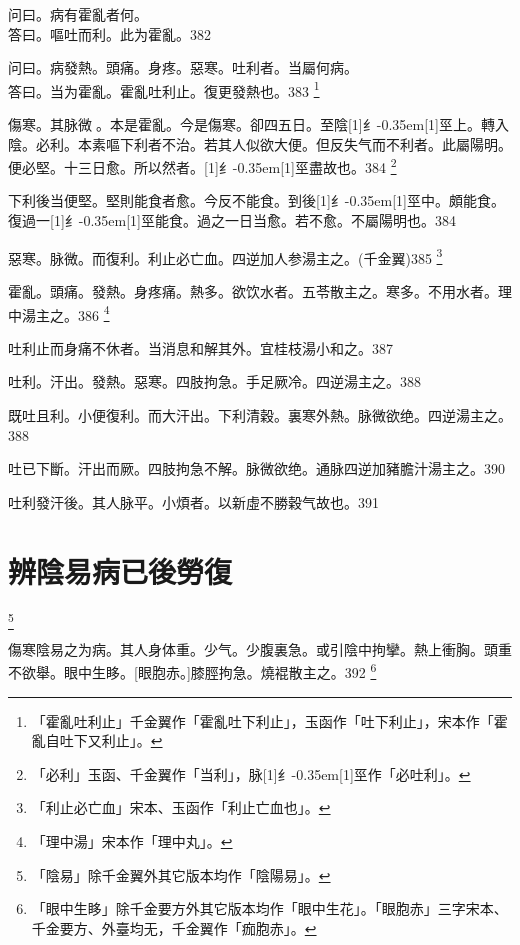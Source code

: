 \documentclass[oneside,b4paper]{ctexbook}
\begin{document}
\begin{flushleft}
问曰。病有霍亂者何。\\
答曰。嘔吐而利。此为霍亂。382

问曰。病發熱。頭痛。身疼。惡寒。吐利者。当屬何病。\\
答曰。当为霍亂。霍亂吐利止。復更發熱也。383
\footnote{「霍亂吐利止」千金翼作「霍亂吐下利止」，玉函作「吐下利止」，宋本作「霍亂自吐下又利止」。}

傷寒。其脉微{𬈧}。本是霍亂。今是傷寒。卻四五日。至陰{\hbox{\scalebox{0.68}[1]{纟}\kern-0.35em\scalebox{0.64}[1]{巠}}}上。轉入陰。必利。本素嘔下利者不治。若其人似欲大便。但反失气而不利者。此屬陽明。便必堅。十三日愈。所以然者。{\hbox{\scalebox{0.68}[1]{纟}\kern-0.35em\scalebox{0.64}[1]{巠}}}盡故也。384
\footnote{「必利」玉函、千金翼作「当利」，脉{\hbox{\scalebox{0.68}[1]{纟}\kern-0.35em\scalebox{0.64}[1]{巠}}}作「必吐利」。}

下利後当便堅。堅則能食者愈。今反不能食。到後{\hbox{\scalebox{0.68}[1]{纟}\kern-0.35em\scalebox{0.64}[1]{巠}}}中。頗能食。復過一{\hbox{\scalebox{0.68}[1]{纟}\kern-0.35em\scalebox{0.64}[1]{巠}}}能食。過之一日当愈。若不愈。不屬陽明也。384

惡寒。脉微。而復利。利止必亡血。四逆加人参湯主之。(千金翼)385
\footnote{「利止必亡血」宋本、玉函作「利止亡血也」。}

霍亂。頭痛。發熱。身疼痛。熱多。欲饮水者。五苓散主之。寒多。不用水者。理中湯主之。386
\footnote{「理中湯」宋本作「理中丸」。}

吐利止而身痛不休者。当消息和解其外。宜桂枝湯小和之。387

吐利。汗出。發熱。惡寒。四肢拘急。手足厥冷。四逆湯主之。388

既吐且利。小便復利。而大汗出。下利清穀。裏寒外熱。脉微欲绝。四逆湯主之。388

吐已下斷。汗出而厥。四肢拘急不解。脉微欲绝。通脉四逆加豬膽汁湯主之。390

吐利發汗後。其人脉平。小煩者。以新虛不勝穀气故也。391

\chapter{辨陰易病已後勞復}

\footnote{「陰易」除千金翼外其它版本均作「陰陽易」。}

傷寒陰易之为病。其人身体重。少气。少腹裏急。或引陰中拘攣。熱上衝胸。頭重不欲舉。眼中生眵。[眼胞赤。]膝脛拘急。燒裩散主之。392
\footnote{「眼中生眵」除千金要方外其它版本均作「眼中生花」。「眼胞赤」三字宋本、千金要方、外臺均无，千金翼作「痂胞赤」。}


\end{flushleft}
\end{document}
